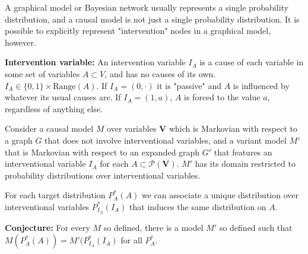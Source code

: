A graphical model or Bayesian network usually represents a single probability distribution, and a causal model is not just a single probability distribution. It is possible to explicitly represent "intervention" nodes in a graphical model, however.

\textbf{Intervention variable:} An intervention variable $I_A$ is a cause of each variable in some set of variables $A\subset V$, and has no causes of its own. $I_A\in \{0,1\}\times \mathrm{Range}(A)$. If $I_A=(0,\cdot)$ it is "passive" and $A$ is influenced by whatever its usual causes are. If $I_A=(1,a)$, $A$ is forced to the value $a$, regardless of anything else.

Consider a causal model $M$ over variables $\mathbf{V}$ which is Markovian with respect to a graph $G$ that does not involve interventional variables, and a variant model $M'$ that is Markovian with respect to an expanded graph $G'$ that features an interventional variable $I_A$ for each $A\subset\mathscr{P}(\mathbf{V})$. $M'$ has its domain restricted to probability distributions over interventional variables.

For each target distribution $P^*_{A}(A)$ we can associate a unique distribution over interventional variables $P^*_{I_A}(I_A)$ that induces the same distribution on $A$.

\textbf{Conjecture:} For every $M$ so defined, there is a model $M'$ so defined such that $M(P^*_A(A))=M'(P^*_{I_A}(I_A)$ for all $P^*_A$.